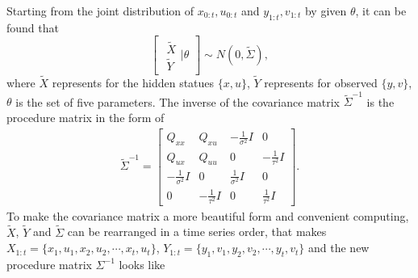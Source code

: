 Starting from the joint distribution of $x_{0:t},u_{0:t}$ and $y_{1:t},v_{1:t}$ by given $\theta$, it can be found that
\begin{equation}\label{jointmatrix}
\begin{bmatrix} \begin{matrix} \tilde{X}\\ \tilde{Y}  \end{matrix} \biggr\rvert \theta \end{bmatrix}
\sim N\left(0, \tilde{\Sigma} \right),
\end{equation}
where $\tilde{X}$ represents for the hidden statues $\{x,u\}$, $\tilde{Y}$ represents for observed $\{y,v\}$, $\theta$ is the set of five parameters.  The inverse of the covariance matrix $\tilde{\Sigma}^{-1}$ is the procedure matrix in the form of
\begin{align*} \tilde{\Sigma}^{-1}=
\begin{bmatrix}
Q_{xx} & Q_{xu} & -\frac{1}{\sigma^2}I & 0\\
Q_{ux} & Q_{uu} & 0 &-\frac{1}{\tau^2}I \\
-\frac{1}{\sigma^2}I & 0 & \frac{1}{\sigma^2}I  & 0\\
 0  &  -\frac{1}{\tau^2}I  & 0 & \frac{1}{\tau^2}I 
\end{bmatrix}.
\end{align*}
To make the covariance matrix a more beautiful form and convenient computing, $\tilde{X}$, $\tilde{Y}$ and $\tilde{\Sigma}$ can be rearranged in a time series order, that makes $X_{1:t} = \{x_1,u_1,x_2,u_2,\cdots, x_t, u_t \}$, $Y_{1:t} = \{y_1,v_1,y_2,v_2,\cdots, y_t, v_t \}$ and the new procedure matrix $\Sigma^{-1}$ looks like 
